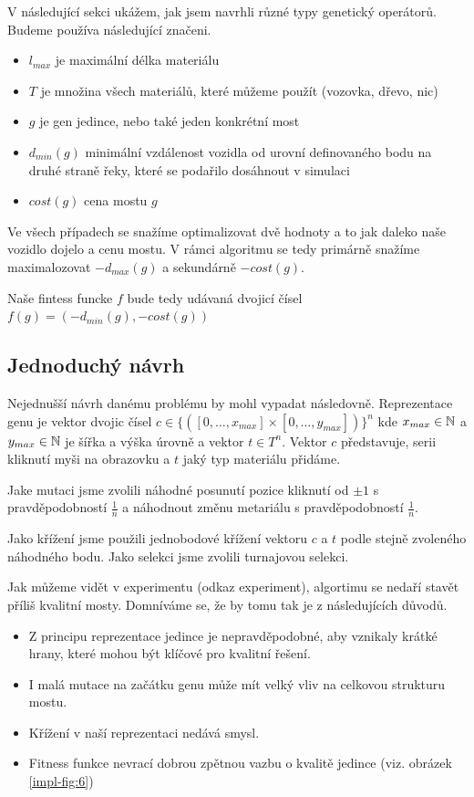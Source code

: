 V následující sekci ukážem, jak jsem navrhli různé typy genetický operátorů. Budeme používa následující značeni.

\begin{itemize}
    \item $l_{max}$ je maximální délka materiálu
    \item $T$ je množina všech materiálů, které můžeme použít (vozovka, dřevo, nic)
    \item $g$ je gen jedince, nebo také jeden konkrétní most
    \item $d_{min}(g)$ minimální vzdálenost vozidla od urovní definovaného bodu na druhé straně řeky, které se podařilo dosáhnout v simulaci
    \item $cost(g)$ cena mostu $g$
\end{itemize}

Ve všech případech se snažíme optimalizovat dvě hodnoty a to jak daleko naše vozidlo dojelo a cenu mostu. V rámci algoritmu se tedy primárně snažíme maximalozovat $-d_{max}(g)$ a sekundárně $-cost(g)$.

Naše fintess funcke $f$ bude tedy udávaná dvojicí čísel $f(g) = (-d_{min}(g), -cost(g))$

\subsection{Jednoduchý návrh}

Nejednušší návrh danému problému by mohl vypadat následovně. Reprezentace genu je vektor dvojic čísel $c \in \{([0, \dots, x_{max}] \times [0, \dots, y_{max}])\}^n$ kde $x_{max} \in \mathbb{N}$ a $y_{max} \in \mathbb{N}$ je šířka a výška úrovně a vektor $t \in T^n$. Vektor $c$ představuje, serii kliknutí myši na obrazovku a $t$ jaký typ materiálu přidáme.

Jake mutaci jsme zvolili náhodné posunutí pozice kliknutí od $\pm 1$ s pravděpodobností $\frac{1}{n}$ a náhodnout změnu metariálu s pravděpodobností $\frac{1}{n}$.

Jako křížení jsme použili jednobodové křížení vektoru $c$  a $t$ podle stejně zvoleného náhodného bodu. Jako selekci jsme zvolili turnajovou selekci.

Jak můžeme vidět v experimentu (odkaz experiment), algortimu se nedaří stavět příliš kvalitní mosty. Domníváme se, že by tomu tak je z následujících důvodů.

\begin{itemize}
    \item Z principu reprezentace jedince je nepravděpodobné, aby vznikaly krátké hrany, které mohou být klíčové pro kvalitní řešení.
    \item I malá mutace na začátku genu může mít velký vliv na celkovou strukturu mostu.
    \item Křížení v naší reprezentaci nedává smysl.
    \item Fitness funkce nevrací dobrou zpětnou vazbu o kvalitě jedince (viz. obrázek \ref{impl-fig:6})
\end{itemize}

